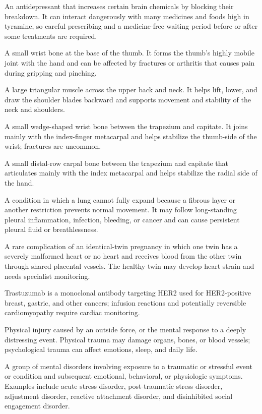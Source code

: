  An antidepressant that increases certain brain chemicals by blocking their breakdown. It can interact dangerously with many medicines and foods high in tyramine, so careful prescribing and a medicine-free waiting period before or after some treatments are required.

 A small wrist bone at the base of the thumb. It forms the thumb's highly mobile joint with the hand and can be affected by fractures or arthritis that causes pain during gripping and pinching.

 A large triangular muscle across the upper back and neck. It helps lift, lower, and draw the shoulder blades backward and supports movement and stability of the neck and shoulders.

 A small wedge-shaped wrist bone between the trapezium and capitate. It joins mainly with the index-finger metacarpal and helps stabilize the thumb-side of the wrist; fractures are uncommon.

 A small distal-row carpal bone between the trapezium and capitate that articulates mainly with the index metacarpal and helps stabilize the radial side of the hand.

 A condition in which a lung cannot fully expand because a fibrous layer or another restriction prevents normal movement. It may follow long-standing pleural inflammation, infection, bleeding, or cancer and can cause persistent pleural fluid or breathlessness.

 A rare complication of an identical-twin pregnancy in which one twin has a severely malformed heart or no heart and receives blood from the other twin through shared placental vessels. The healthy twin may develop heart strain and needs specialist monitoring.

 Trastuzumab is a monoclonal antibody targeting HER2 used for HER2-positive breast, gastric, and other cancers; infusion reactions and potentially reversible cardiomyopathy require cardiac monitoring.

 Physical injury caused by an outside force, or the mental response to a deeply distressing event. Physical trauma may damage organs, bones, or blood vessels; psychological trauma can affect emotions, sleep, and daily life.

 A group of mental disorders involving exposure to a traumatic or stressful event or condition and subsequent emotional, behavioral, or physiologic symptoms. Examples include acute stress disorder, post-traumatic stress disorder, adjustment disorder, reactive attachment disorder, and disinhibited social engagement disorder.

